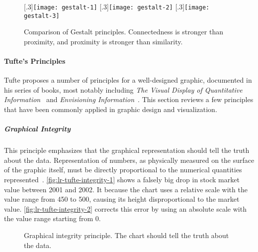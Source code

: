\begin{figure}[!htb]
\centering
{}[.3\columnwidth]{\texttt{[image: gestalt-1]}} 
\hfill
{}[.3\columnwidth]{\texttt{[image: gestalt-2]}} 
\hfill
{}[.3\columnwidth]{\texttt{[image: gestalt-3]}}
\caption{Comparison of Gestalt principles. Connectedness is stronger than proximity, and proximity is stronger than similarity. }
\label{fig:lr-gestalt}
\end{figure}

\paragraph{Tufte's Principles}
Tufte proposes a number of principles for a well-designed graphic, documented in his series of books, most notably including \emph{The Visual Display of Quantitative Information}~\cite{Tufte1983} and \emph{Envisioning Information}~\cite{Tufte1990}. This section reviews a few principles that have been commonly applied in graphic design and visualization.

\subparagraph{Graphical Integrity}
This principle emphasizes that the graphical representation should tell the truth about the data. Representation of numbers, as physically measured on the surface of the	graphic	itself,	must be directly proportional to the numerical quantities represented~\cite{Tufte1983}. \autoref{fig:lr-tufte-integrity-1} shows a falsely big drop in stock market value between 2001 and 2002. It because the chart uses a relative scale with the value range from 450 to 500, causing its height disproportional to the market value. \autoref{fig:lr-tufte-integrity-2} corrects this error by using an absolute scale with the value range starting from 0.

\begin{figure}[!htb]
\centering
{} 
\hfill
{} 
\caption{Graphical integrity principle. The chart should tell the truth about the data.}
\label{fig:lr-tufte-integrity}
\end{figure}

